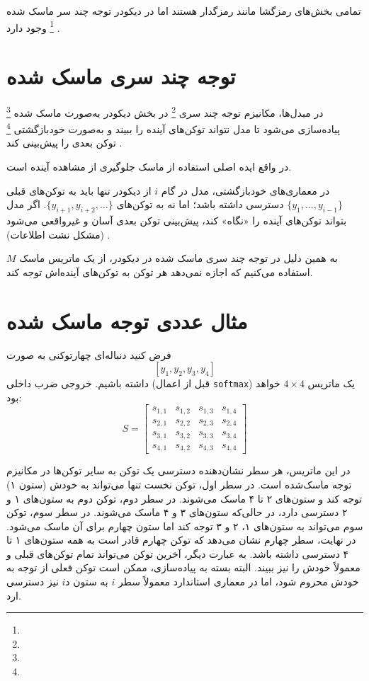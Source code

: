 تمامی بخش‌های رمزگشا مانند رمزگدار هستند اما در دیکودر توجه چند سر ماسک شده \footnote{} وجود دارد \cite{vaswani2017attention}.



\section{توجه  چند سری ماسک شده}
در مبدل‌ها، مکانیزم توجه چند سری \footnote{} در بخش دیکودر به‌صورت ماسک شده \footnote{} پیاده‌سازی می‌شود تا مدل نتواند توکن‌های آینده را ببیند و به‌صورت خودبازگشتی \footnote{} توکن بعدی را پیش‌بینی کند \cite{vaswani2017attention}.


در واقع ایده اصلی استفاده از ماسک جلوگیری از مشاهده آینده است.

در معماری‌های خودبازگشتی، مدل در گام \( i \) از دیکودر تنها باید به توکن‌های قبلی \( \{ y_1, \dots, y_{i-1} \} \) دسترسی داشته باشد؛ اما نه به توکن‌های \( \{ y_{i+1}, y_{i+2}, \dots \} \). اگر مدل بتواند توکن‌های آینده را «نگاه» کند، پیش‌بینی توکن بعدی آسان و غیرواقعی می‌شود (مشکل نشت اطلاعات) \cite{bahdanau2014neural,sutskever2014sequence}.

به همین دلیل در توجه چند سری ماسک شده در  دیکودر، از یک ماتریس ماسک \( M \) استفاده می‌کنیم که اجازه نمی‌دهد هر توکن به توکن‌های آینده‌اش توجه کند.

	\section{مثال عددی توجه ماسک شده}
فرض کنید دنباله‌ای چهارتوکنی به صورت
\[
[y_1, y_2, y_3, y_4]
\]
داشته باشیم. خروجی ضرب داخلی (قبل از اعمال \texttt{softmax}) یک ماتریس \(4 \times 4\) خواهد بود:
\[
S =
\begin{bmatrix}
	s_{1,1} & s_{1,2} & s_{1,3} & s_{1,4} \\
	s_{2,1} & s_{2,2} & s_{2,3} & s_{2,4} \\
	s_{3,1} & s_{3,2} & s_{3,3} & s_{3,4} \\
	s_{4,1} & s_{4,2} & s_{4,3} & s_{4,4}
\end{bmatrix}
\]

در این ماتریس، هر سطر نشان‌دهنده دسترسی یک توکن به سایر توکن‌ها در مکانیزم توجه ماسک‌شده است. در سطر اول، توکن نخست تنها می‌تواند به خودش (ستون ۱) توجه کند و ستون‌های ۲ تا ۴ ماسک می‌شوند. در سطر دوم، توکن دوم به ستون‌های ۱ و ۲ دسترسی دارد، در حالی‌که ستون‌های ۳ و ۴ ماسک می‌شوند. در سطر سوم، توکن سوم می‌تواند به ستون‌های ۱، ۲ و ۳ توجه کند اما ستون چهارم برای آن ماسک می‌شود. در نهایت، سطر چهارم نشان می‌دهد که توکن چهارم قادر است به همه ستون‌های ۱ تا ۴ دسترسی داشته باشد. به عبارت دیگر، آخرین توکن می‌تواند تمام توکن‌های قبلی و معمولاً خودش را نیز ببیند. البته بسته به پیاده‌سازی، ممکن است توکن فعلی از توجه به خودش محروم شود، اما در معماری استاندارد معمولاً سطر \( i \) به ستون \( iد \) نیز دسترسی ارد.

